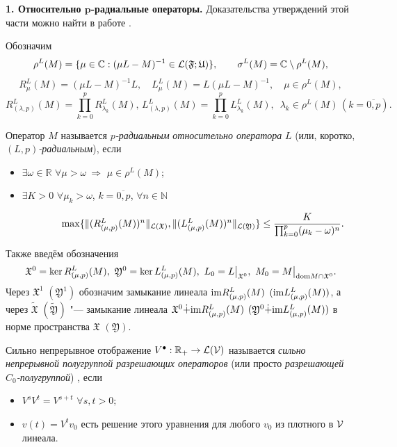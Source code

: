 \smallskip

\textbf{1. Относительно $\boldsymbol p$-радиальные операторы.}
Доказательства утверждений этой части можно найти в работе \cite{SagShul:bib:SvFed}.

Обозначим
$$\rho^L(M)=\{\mu\in{\mathbb C}:(\mu L-M)^{-1} \in{\cal L(\mathfrak F;\mathfrak U)}\},\qquad\sigma^L(M)={\mathbb C}\setminus\rho^L(M),$$
$$R_{\mu }^L(M) =(\mu L-M)^{-1}L,\quad L_{\mu }^L(M)=L(\mu L-M)^{-1},\quad\mu\in\rho^L(M),$$
$$R_{(\lambda ,p)}^L(M)\!=\!\prod \limits_{k=0}^p\!R_{\lambda _k}^L(M),\,
L_{(\lambda ,p)}^L(M)\!=\!\prod\limits_{k=0}^p\!L_{\lambda_k}^L(M),\,\,\,\lambda_k\!\in\!\rho^L(M)\,(k=\overline{0,p}).
$$

\smallskip

\begin{definition}[1]{\rm Оператор $M$ называется {\it $p$-радиальным} {\it
относительно оператора} $L$ (или, коротко, $(L,p)${\it -радиальным}),
если
\begin{itemize}
\item[(i)] $\exists \omega\!\in {\mathbb R}$ $\forall\mu >\omega\ \Rightarrow$ $ \mu\!\in\rho
^L(M)$;

\item[(ii)] $\exists K>0$ $ \forall\mu_k >\omega$, $k=\overline{0, p}$, $\forall n\!\in {\mathbb N}$

$\qquad\qquad \max\{ \| (R_{(\mu ,p)}^L(M))^n\|
_{{\cal L}({\mathfrak X})}, \| (L_{(\mu, p)}^L(M))^n \| _{{\cal L}({\mathfrak Y})}\}\le
{\displaystyle\frac {K}{\prod _{k=0}^p (\mu _k-\omega)^n}.}$

\end{itemize}

}\end{definition}

\smallskip

Также введём обозначения
$$\mathfrak X^0=\ker R_{(\mu,p)}^L(M),\,\,
\mathfrak Y^0=\ker L_{(\mu,p)}^L(M),\,\,L_0=L\bigr|_{\mathfrak X^0},\,\,M_0=M\bigr|_{{\rm dom}M\cap\mathfrak X^0}.$$
Через ${\mathfrak X}^1$ $({\mathfrak Y}^1)$ обозначим замыкание линеала
${\rm im} R_{(\mu,p)}^L(M)$ $({\rm im} L_{(\mu ,p)}^L(M))$,
а через $\tilde {\mathfrak X}$ $ (\tilde {\mathfrak Y})$ "--- замыкание линеала
${\mathfrak X}^0\dot + {\rm im} R_{(\mu ,p)}^L(M)$
$({\mathfrak Y}^0 \dot + {\rm im} L_{(\mu ,p)}^L(M))$ в норме пространства
${\mathfrak X}$ $({\mathfrak Y})$.

\smallskip
\begin{definition}[2]{\rm
Сильно непрерывное отображение $V^{\bullet}:{\mathbb R} _+\to {\cal L(V)}$ называется
{\it сильно непрерывной полугруппой разрешающих операторов} (или просто
{\it разрешающей $C_0$-полугруппой})%
, если
\begin{itemize}
\item[(i)] $V^sV^t=V^{s+t}$ $\forall s,t>0;$
\item[(ii)] $v(t)=V^tv_0$ есть решение этого уравнения для любого $v_0$ из
плотного в ${\cal V}$ линеала.
\end{itemize}
}\end{definition}

